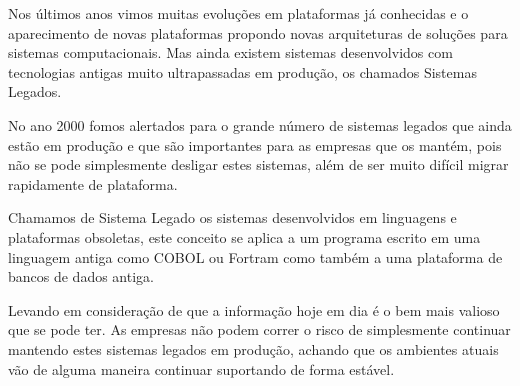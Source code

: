 Nos últimos anos vimos muitas evoluções em plataformas já conhecidas e o aparecimento de novas plataformas propondo novas arquiteturas de soluções para sistemas computacionais. Mas ainda existem sistemas desenvolvidos com tecnologias antigas muito ultrapassadas em produção, os chamados Sistemas Legados. \cite{roberto2005}

No ano 2000 fomos alertados para o grande número de sistemas legados que ainda estão em produção e que são importantes para as empresas que os mantém, pois não se pode simplesmente desligar estes sistemas, além de ser muito difícil migrar rapidamente de plataforma.

Chamamos de Sistema Legado os sistemas desenvolvidos em linguagens e plataformas obsoletas, este conceito se aplica a um programa escrito em uma linguagem antiga como COBOL ou Fortram como também a uma plataforma de bancos de dados antiga.

Levando em consideração de que a informação hoje em dia é o bem mais valioso que se pode ter. As empresas não podem correr o risco de simplesmente continuar mantendo estes sistemas legados em produção, achando que os ambientes atuais vão de alguma maneira continuar suportando de forma estável.

